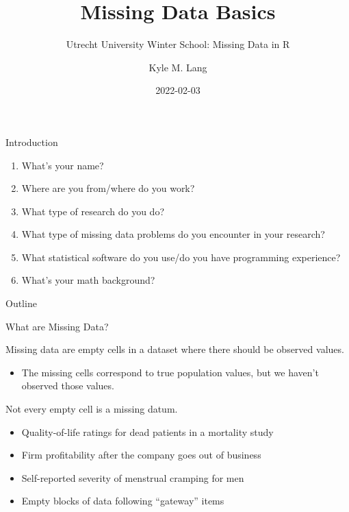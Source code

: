 \documentclass{beamer}\usepackage[]{graphicx}\usepackage[]{color}
\title{Missing Data Basics}
\subtitle{Utrecht University Winter School: Missing Data in R}
\author{Kyle M. Lang}
\institute{Department of Methodology \& Statistics\\Utrecht University}
\date{2022-02-03}
\begin{document}

\begin{frame}[t, plain]
  \titlepage
\end{frame}


\begin{frame}{Introduction}

  \begin{enumerate}
  \item What's your name?
    \vc
  \item Where are you from/where do you work?
    \vc
  \item What type of research do you do?
    \vc
  \item What type of missing data problems do you encounter in your research?
    \vc
  \item What statistical software do you use/do you have programming experience?
    \vc
  \item What's your math background?
  \end{enumerate}
  
\end{frame}


\begin{frame}{Outline}
  \tableofcontents
\end{frame}


\begin{frame}{What are Missing Data?}
  
  Missing data are empty cells in a dataset where there should be observed 
  values.
  \vc
  \begin{itemize}
  \item The missing cells correspond to true population values, but we haven't 
    observed those values.
  \end{itemize}
  \vb 
  \pause
  Not every empty cell is a missing datum.
  \vc
  \begin{itemize}
  \item Quality-of-life ratings for dead patients in a mortality study
    \vc
  \item Firm profitability after the company goes out of business
    \vc
  \item Self-reported severity of menstrual cramping for men
    \vc
  \item Empty blocks of data following ``gateway'' items
  \end{itemize}
  
\end{frame}
\end{document}
